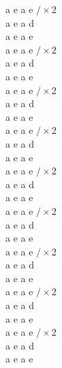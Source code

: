 \documentclass[a5paper, 10pt]{book}
\begin{document}
\begin{minipage}[t]{0.2\textwidth}
a e a e $/\times$2\\
a e a d\\
a e a e\\

a e a e $/\times$2\\
a e a d\\
a e a e\\

a e a e $/\times$2\\
a e a d\\
a e a e\\

a e a e $/\times$2\\
a e a d\\
a e a e\\

a e a e $/\times$2\\
a e a d\\
a e a e\\

a e a e $/\times$2\\
a e a d\\
a e a e\\

a e a e $/\times$2\\
a e a d\\
a e a e\\

a e a e $/\times$2\\
a e a d\\
a e a e\\

a e a e $/\times$2\\
a e a d\\
a e a e\\
\end{minipage}

\newpage
\end{document}
